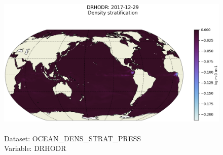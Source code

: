 \begin{figure}[H]
\centering
\includegraphics[scale=0.5]{../images/plots/latlon_plots/Ocean_Density_Stratification_and_Hydrostatic_Pressure/DRHODR.png}
\caption{\\Dataset: OCEAN\_DENS\_STRAT\_PRESS\\Variable: DRHODR}
\label{tab:table-OCEAN_DENS_STRAT_PRESS_DRHODR-Plot}
\end{figure}
\pagebreak
